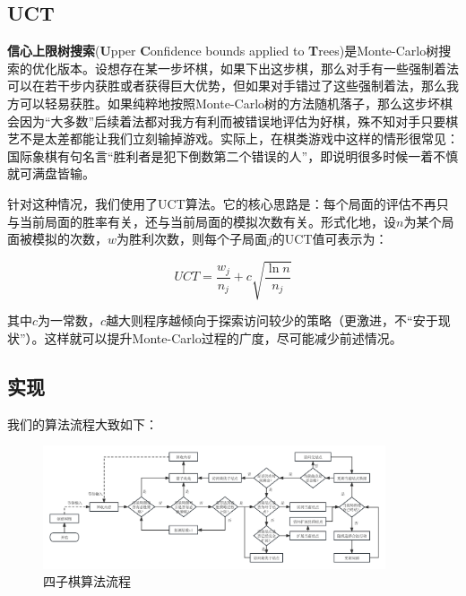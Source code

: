 \documentclass{article}
\begin{document}
	\subsection{UCT}
	
	\textbf{信心上限树搜索}(\textbf{U}pper \textbf{C}onfidence bounds applied to \textbf{T}rees)是Monte-Carlo树搜索的优化版本。设想存在某一步坏棋，如果下出这步棋，那么对手有一些强制着法可以在若干步内获胜或者获得巨大优势，但如果对手错过了这些强制着法，那么我方可以轻易获胜。如果纯粹地按照Monte-Carlo树的方法随机落子，那么这步坏棋会因为“大多数”后续着法都对我方有利而被错误地评估为好棋，殊不知对手只要棋艺不是太差都能让我们立刻输掉游戏。实际上，在棋类游戏中这样的情形很常见：国际象棋有句名言“胜利者是犯下倒数第二个错误的人”，即说明很多时候一着不慎就可满盘皆输。
	
	针对这种情况，我们使用了UCT算法。它的核心思路是：每个局面的评估不再只与当前局面的胜率有关，还与当前局面的模拟次数有关。形式化地，设$n$为某个局面被模拟的次数，$w$为胜利次数，则每个子局面$j$的UCT值可表示为：
	
	\begin{equation}
		UCT = \frac{w_j}{n_j} + c\sqrt{\frac{\ln{n}}{n_j}}
	\end{equation}

	其中$c$为一常数，$c$越大则程序越倾向于探索访问较少的策略（更激进，不“安于现状”）。这样就可以提升Monte-Carlo过程的广度，尽可能减少前述情况。
	
	\subsection{实现}
	
	我们的算法流程大致如下：
	
	\begin{figure}[ht]
		\centering
		\includegraphics[width=0.9\textwidth]{procedure.png}
		\caption{四子棋算法流程}
	\end{figure}
	
\end{document}
